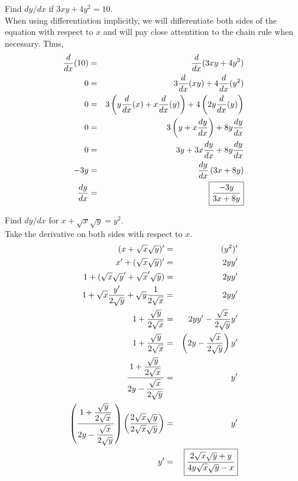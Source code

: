 \documentclass{book}
\begin{document}
\begin{Exam} Find $dy/dx$ if $3xy + 4y^2 = 10$.\\

When using differentiation implicitly, we will differentiate both sides of the equation with respect to $x$ and will pay close attentition to the chain rule when necessary. Thus,
\begin{eqnarray*}
\dfrac{d}{dx}(10) &=& \dfrac{d}{dx}(3xy + 4y^2)\\
 0&=& 3\dfrac{d}{dx}(xy) + 4\dfrac{d}{dx}(y^2)\\
   0&=& 3\left(y\dfrac{d}{dx}(x) + x\dfrac{d}{dx}(y)\right) + 4\left(2y\dfrac{d}{dx}(y)\right)\\
 0 &=&  3\left(y + x\dfrac{dy}{dx}\right) + 8y\dfrac{dy}{dx}\\
   0&=& 3y + 3x\dfrac{dy}{dx} + 8y\dfrac{dy}{dx}\\
     -3y &=& \dfrac{dy}{dx}\left(3x + 8y\right)\\
       \dfrac{dy}{dx} &=& \fbox{$\dfrac{-3y}{3x+8y}$}
\end{eqnarray*}
\end{Exam}\vs

\begin{Exam} Find $dy/dx$ for $x + \sqrt{x}\sqrt{y} = y^2$.\\

Take the derivative on both sides with respect to $x$.
\begin{eqnarray*}
(x+\sqrt{x}\sqrt{y})' &=& (y^2)'\\
  x' + (\sqrt{x}\sqrt{y})' &=& 2yy'\\ 
   1 + (\sqrt{x}\sqrt{y}' + \sqrt{x}'\sqrt{y}) &=& 2yy'\\ 
    1 + \sqrt{x}\dfrac{y'}{2\sqrt{y}} + \sqrt{y}\dfrac{1}{2\sqrt{x}} &=&  2yy'\\
    1 + \dfrac{\sqrt{y}}{2\sqrt{x}} &=& 2yy' - \dfrac{\sqrt{x}}{2\sqrt{y}}y'\\
       1 + \dfrac{\sqrt{y}}{2\sqrt{x}} &=& \left(2y - \dfrac{\sqrt{x}}{2\sqrt{y}}\right)y'\\
 \dfrac{1 + \dfrac{\sqrt{y}}{2\sqrt{x}}}{2y - \dfrac{\sqrt{x}}{2\sqrt{y}}}  &=&  y'\\
 \left(\dfrac{1 + \dfrac{\sqrt{y}}{2\sqrt{x}}}{2y - \dfrac{\sqrt{x}}{2\sqrt{y}}}\right)\left(\dfrac{2\sqrt{x}\sqrt{y}}{2\sqrt{x}\sqrt{y}}\right)  &=&  y'\\
   y' &=& \fbox{$\dfrac{2\sqrt{x}\sqrt{y} + y}{4y\sqrt{x}\sqrt{y} - x}$}
\end{eqnarray*}
\end{Exam}\vs
\end{document}
